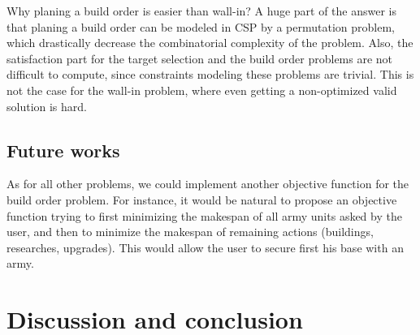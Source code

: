 \documentclass[journal]{IEEEtran}
\newcommand{\csp}{\textsc{CSP}\xspace}
\begin{document}
Why planing a build  order is easier than wall-in? A  huge part of the
answer is  that planing  a build  order can  be modeled  in \csp  by a
permutation  problem,  which  drastically decrease  the  combinatorial
complexity of the problem. Also,  the satisfaction part for the target
selection and the  build order problems are not  difficult to compute,
since constraints  modeling these problems  are trivial.  This  is not
the case for  the wall-in problem, where even  getting a non-optimized
valid solution is hard. 

\subsection{Future works}

As  for  all other  problems,  we  could implement  another  objective
function  for the  build  order  problem. For  instance,  it would  be
natural to  propose an objective  function trying to  first minimizing
the makespan of all army units asked by the user, and then to minimize
the   makespan   of    remaining   actions   (buildings,   researches,
upgrades). This would allow the user  to secure first his base with an
army.

\section{Discussion and conclusion}\label{sec:conclusion}








\ifCLASSOPTIONcaptionsoff
  \newpage
\fi

                                                    


\end{document}
